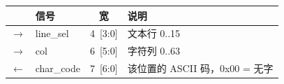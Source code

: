 \begin{tabular}{@{}c l c p{3.9cm}@{}}
\toprule
\textbf{} & \textbf{信号} & \textbf{宽} & \textbf{说明}\\
\midrule
$\rightarrow$ & {\ttfamily line\_sel} & 4{\scriptsize\ttfamily\ {[}3:0{]}} & 文本行 0..15 \\
$\rightarrow$ & {\ttfamily col} & 6{\scriptsize\ttfamily\ {[}5:0{]}} & 字符列 0..63 \\
$\leftarrow$ & {\ttfamily char\_code} & 7{\scriptsize\ttfamily\ {[}6:0{]}} & 该位置的 ASCII 码，0x00 = 无字 \\
\bottomrule
\end{tabular}
